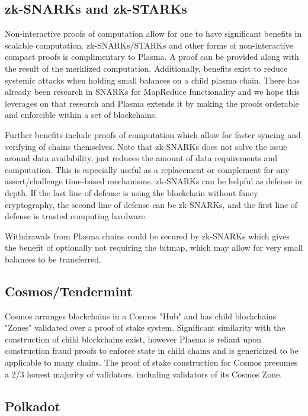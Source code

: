 \documentclass[letterpaper, 11pt]{article}
\begin{document}
\subsection{zk-SNARKs and zk-STARKs}

Non-interactive proofs of computation allow for one to have significant
benefits in scalable computation\cite{snarks}. zk-SNARKs/STARKs and other forms
of non-interactive compact proofs is complimentary to Plasma. A proof can be
provided along with the result of the merklized computation. Additionally,
benefits exist to reduce systemic attacks when holding small balances on a
child plasma chain. There has already been research in SNARKs for MapReduce
functionality\cite{snarksmr} and we hope this leverages on that research and
Plasma extends it by making the proofs orderable and enforcible within a set of
blockchains.

Further benefits include proofs of computation which allow for faster syncing
and verifying of chains themselves. Note that zk-SNARKs does not solve the issue
around data availability, just reduces the amount of data requirements and
computation. This is especially useful as a replacement or complement for any
assert/challenge time-based mechanisms. zk-SNARKs can be helpful as defense in
depth. If the last line of defense is using the blockchain without fancy
cryptography, the second line of defense can be zk-SNARKs, and the first line of
defense is trusted computing hardware.

Withdrawals from Plasma chains could be secured by zk-SNARKs which gives the
benefit of optionally not requiring the bitmap, which may allow for very small
balances to be transferred.

\subsection{Cosmos/Tendermint}

Cosmos\cite{cosmos} arranges blockchains in a Cosmos "Hub" and has child blockchains "Zones"
validated over a proof of stake system. Significant similarity with the
construction of child blockchains exist, however Plasma is reliant upon
construction fraud proofs to enforce state in child chains and is genericized
to be applicable to many chains. The proof of stake construction for Cosmos
presumes a 2/3 honest majority of validators, including validators of its
Cosmos Zone.

\subsection{Polkadot}
\end{document}
